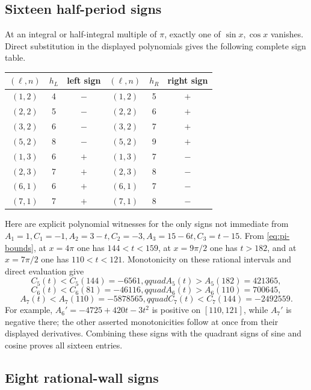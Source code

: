 \documentclass[11pt]{article}
\begin{document}
\subsection{Sixteen half-period signs}

At an integral or half-integral multiple of \(\pi\), exactly one of
\(\sin x,\cos x\) vanishes.  Direct substitution in the displayed
polynomials gives the following complete sign table.
\begin{center}
\small
\begin{tabular}{c|c|c@{\qquad}c|c|c}
\toprule
\((\ell,n)\)&\(h_L\)&left sign&\((\ell,n)\)&\(h_R\)&right sign\\
\midrule
\((1,2)\)&4&\(-\)&\((1,2)\)&5&\(+\)\\
\((2,2)\)&5&\(-\)&\((2,2)\)&6&\(+\)\\
\((3,2)\)&6&\(-\)&\((3,2)\)&7&\(+\)\\
\((5,2)\)&8&\(-\)&\((5,2)\)&9&\(+\)\\
\((1,3)\)&6&\(+\)&\((1,3)\)&7&\(-\)\\
\((2,3)\)&7&\(+\)&\((2,3)\)&8&\(-\)\\
\((6,1)\)&6&\(+\)&\((6,1)\)&7&\(-\)\\
\((7,1)\)&7&\(+\)&\((7,1)\)&8&\(-\)\\
\bottomrule
\end{tabular}
\end{center}
Here are explicit polynomial witnesses for the only signs not immediate
from \(A_1=1,C_1=-1,A_2=3-t,C_2=-3,A_3=15-6t,C_3=t-15\).
From \eqref{eq:pi-bounds}, at \(x=4\pi\) one has
\(144<t<159\), at \(x=9\pi/2\) one has \(t>182\), and at
\(x=7\pi/2\) one has \(110<t<121\).  Monotonicity on these rational
intervals and direct evaluation give
\[
 C_5(t)<C_5(144)=-6561,qquad
 A_5(t)>A_5(182)=421365,
\]
\[
 C_6(t)<C_6(81)=-46116,qquad
 A_6(t)>A_6(110)=700645,
\]
\[
 A_7(t)<A_7(110)=-5878565,qquad
 C_7(t)<C_7(144)=-2492559.
\]
For example, \(A_6'=-4725+420t-3t^2\) is positive on
\([110,121]\), while \(A_7'\) is negative there; the other asserted
monotonicities follow at once from their displayed derivatives.  Combining
these signs with the quadrant signs of sine and cosine proves all sixteen
entries.

\subsection{Eight rational-wall signs}
\end{document}
